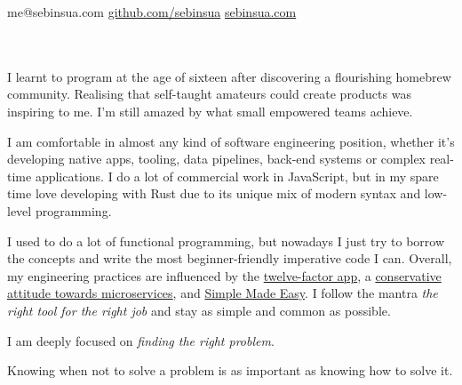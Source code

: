 \documentclass[10pt,a4paper]{article}
\begin{document}
\sloppy  %


\nobreakvspace{0.3em}  %

\noindent
me@sebinsua.com\sbull
\href{http://github.com/sebinsua}{github.com/sebinsua}\sbull
\href{http://sebinsua.com}{sebinsua.com}

\spacedhrule{0.9em}{-0.4em}  %


\vspace{-1.3em}  %
\begin{multicols}{2}  %
\\
\\
\noindent I learnt to program at the age of sixteen after discovering a flourishing homebrew community. Realising that self-taught amateurs could create products was inspiring to me. I'm still amazed by what small empowered teams achieve.\newline

\noindent I am comfortable in almost any kind of software engineering position, whether it's developing native apps, tooling, data pipelines, back-end systems or complex real-time applications. I do a lot of commercial work in JavaScript, but in my spare time love developing with Rust due to its unique mix of modern syntax and low-level programming.\newline

\noindent I used to do a lot of functional programming, but nowadays I just try to borrow the concepts and write the most beginner-friendly imperative code I can. Overall, my engineering practices are influenced by the \href{http://12factor.net}{twelve-factor app}, a \href{https://www.tigerteam.dk/2014/micro-services-its-not-only-the-size-that-matters-its-also-how-you-use-them-part-2/}{conservative attitude towards microservices}, and \href{http://infoq.com/presentations/Simple-Made-Easy}{Simple Made Easy}. I follow the mantra \emph{the right tool for the right job} and stay as simple and common as possible.\newline

\noindent I am deeply focused on \emph{finding the right problem}.

\noindent Knowing when not to solve a problem is as important as knowing how to solve it.

\end{multicols}
\end{document}
